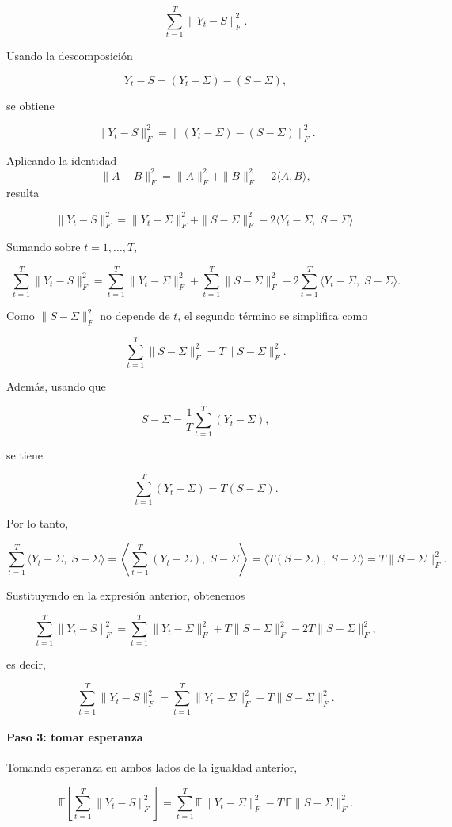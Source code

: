 \documentclass[letterpaper,12pt,oneside]{book}
\begin{document}
\[
\sum_{t=1}^{T}\|Y_t-S\|_F^2.
\]

Usando la descomposición

\[
Y_t-S = (Y_t-\Sigma) - (S-\Sigma),
\]

se obtiene

\[
\|Y_t-S\|_F^2
=
\|(Y_t-\Sigma) - (S-\Sigma)\|_F^2.
\]

Aplicando la identidad
\[
\|A-B\|_F^2 = \|A\|_F^2 + \|B\|_F^2 - 2\langle A,B\rangle,
\]
resulta

\[
\|Y_t-S\|_F^2
=
\|Y_t-\Sigma\|_F^2
+
\|S-\Sigma\|_F^2
-
2\langle Y_t-\Sigma,\; S-\Sigma\rangle.
\]

Sumando sobre $t=1,\dots,T$,

\[
\sum_{t=1}^{T}\|Y_t-S\|_F^2
=
\sum_{t=1}^{T}\|Y_t-\Sigma\|_F^2
+
\sum_{t=1}^{T}\|S-\Sigma\|_F^2
-
2\sum_{t=1}^{T}\langle Y_t-\Sigma,\; S-\Sigma\rangle.
\]

Como $\|S-\Sigma\|_F^2$ no depende de $t$, el segundo término se simplifica como

\[
\sum_{t=1}^{T}\|S-\Sigma\|_F^2
=
T\|S-\Sigma\|_F^2.
\]

Además, usando que

\[
S-\Sigma
=
\frac{1}{T}\sum_{t=1}^{T}(Y_t-\Sigma),
\]

se tiene

\[
\sum_{t=1}^{T}(Y_t-\Sigma)=T(S-\Sigma).
\]

Por lo tanto,

\[
\sum_{t=1}^{T}\langle Y_t-\Sigma,\; S-\Sigma\rangle
=
\left\langle
\sum_{t=1}^{T}(Y_t-\Sigma),\; S-\Sigma
\right\rangle
=
\langle T(S-\Sigma),\; S-\Sigma\rangle
=
T\|S-\Sigma\|_F^2.
\]

Sustituyendo en la expresión anterior, obtenemos

\[
\sum_{t=1}^{T}\|Y_t-S\|_F^2
=
\sum_{t=1}^{T}\|Y_t-\Sigma\|_F^2
+
T\|S-\Sigma\|_F^2
-
2T\|S-\Sigma\|_F^2,
\]

es decir,

\[
\sum_{t=1}^{T}\|Y_t-S\|_F^2
=
\sum_{t=1}^{T}\|Y_t-\Sigma\|_F^2
-
T\|S-\Sigma\|_F^2.
\]

\paragraph{Paso 3: tomar esperanza}

Tomando esperanza en ambos lados de la igualdad anterior,

\[
\mathbb{E}\left[\sum_{t=1}^{T}\|Y_t-S\|_F^2\right]
=
\sum_{t=1}^{T}\mathbb{E}\|Y_t-\Sigma\|_F^2
-
T\,\mathbb{E}\|S-\Sigma\|_F^2.
\]
\end{document}
